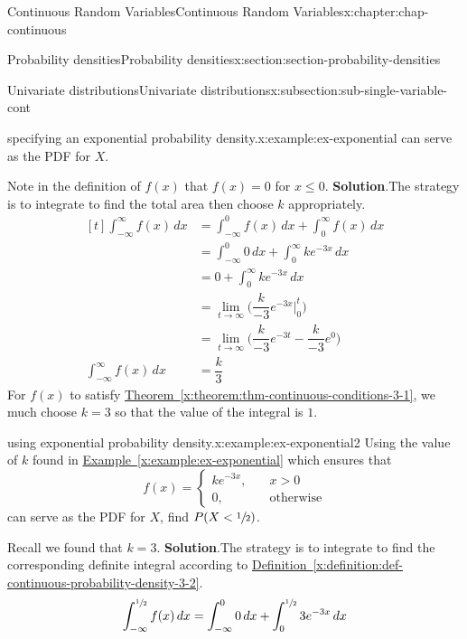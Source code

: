 \documentclass[oneside,10pt,]{book}
\newcommand{\blocktitlefont}{\relax}
\newcommand{\xreffont}{\relax}
\numberwithin{equation}{section}
\newcommand{\lt}{<}
\newcommand{\gt}{>}
\newcommand{\amp}{&}
\begin{document}
\begin{chapterptx}{Continuous Random Variables}{}{Continuous Random Variables}{}{}{x:chapter:chap-continuous}
\begin{sectionptx}{Probability densities}{}{Probability densities}{}{}{x:section:section-probability-densities}
\begin{subsectionptx}{Univariate distributions}{}{Univariate distributions}{}{}{x:subsection:sub-single-variable-cont}
\begin{example}{specifying an exponential probability density.}{x:example:ex-exponential}
can serve as the PDF for \(X\).%
\par
Note in the definition of \(f(x)\) that \(f(x) = 0\) for \(x
\le 0\).%
\textbf{\blocktitlefont Solution}.\quad{}The strategy is to integrate to find the total area then choose \(k\) appropriately.%
\begin{equation*}
\begin{aligned}[t]
\int_{-\infty}^\infty f(x)\,dx \amp = \int_{-\infty}^0 f(x)\,dx +
\int_{0}^\infty f(x)\,dx \\
\amp = \int_{-\infty}^0 0\,dx + \int_{0}^\infty ke^{-3x}\,dx \\
\amp = 0 + \int_{0}^\infty ke^{-3x}\,dx \\
\amp = \lim_{t\to\infty} \Big(\dfrac{k}{-3}e^{-3x}\Big|_0^t\Big) \\
\amp = \lim_{t\to\infty} \Big(\dfrac{k}{-3}e^{-3t} - \dfrac{k}{-3}e^{0}
\Big) \\
\int_{-\infty}^\infty f(x)\,dx\amp = \dfrac{k}{3}
\end{aligned}
\end{equation*}
For \(f(x)\) to satisfy \hyperref[x:theorem:thm-continuous-conditions-3-1]{Theorem~{\xreffont\ref{x:theorem:thm-continuous-conditions-3-1}}}, we much choose \(k=3\) so that the value of the integral is \(1\).%
\end{example}
\begin{example}{using exponential probability density.}{x:example:ex-exponential2}%
Using the value of \(k\) found in \hyperref[x:example:ex-exponential]{Example~{\xreffont\ref{x:example:ex-exponential}}} which ensures that%
\begin{equation*}
f(x) = \begin{cases}ke^{-3x},\amp \quad x \gt 0\\
0,
\amp \quad \text{otherwise}\end{cases}
\end{equation*}
can serve as the PDF for \(X\), find \(P(X \lt \sfrac{1}{2})\).%
\par
Recall we found that \(k=3\).%
\textbf{\blocktitlefont Solution}.\quad{}The strategy is to integrate to find the corresponding definite integral according to \hyperref[x:definition:def-continuous-probability-density-3-2]{Definition~{\xreffont\ref{x:definition:def-continuous-probability-density-3-2}}}.%
\begin{equation*}
\begin{aligned}[t]
\int_{-\infty}^{\sfrac{1}{2}} f(x)\,dx \amp = \int_{-\infty}^0 0\,dx +
\int_{0}^{\sfrac{1}{2}} 3e^{-3x}\,dx \\

\end{aligned}
\end{equation*}
\end{example}
\end{subsectionptx}
\end{sectionptx}
\end{chapterptx}
\end{document}
